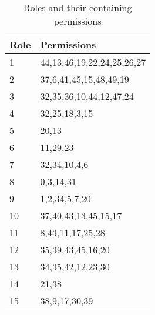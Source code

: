 		\begin{table}[H]
			\centering
			\caption{Roles and their containing permissions}
			\label{tab:dataset2_roles}
			\begin{tabular}{|l|l|}
				\hline
				\rowcolor[HTML]{EFEFEF} 
				Role & Permissions                \\ \hline
				1    & 44,13,46,19,22,24,25,26,27 \\ \hline
				2    & 37,6,41,45,15,48,49,19     \\ \hline
				3    & 32,35,36,10,44,12,47,24    \\ \hline
				4    & 32,25,18,3,15              \\ \hline
				5    & 20,13                      \\ \hline
				6    & 11,29,23                   \\ \hline
				7    & 32,34,10,4,6               \\ \hline
				8    & 0,3,14,31                  \\ \hline
				9    & 1,2,34,5,7,20              \\ \hline
				10   & 37,40,43,13,45,15,17       \\ \hline
				11   & 8,43,11,17,25,28           \\ \hline
				12   & 35,39,43,45,16,20          \\ \hline
				13   & 34,35,42,12,23,30          \\ \hline
				14   & 21,38                      \\ \hline
				15   & 38,9,17,30,39              \\ \hline
			\end{tabular}
		\end{table}
	
